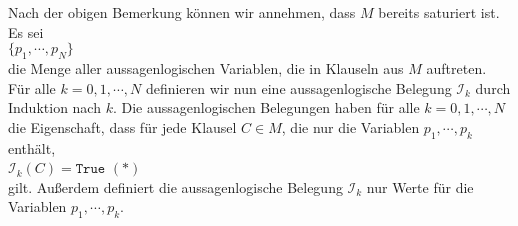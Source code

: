 Nach der obigen Bemerkung können wir annehmen, dass $M$ bereits saturiert ist. Es sei 
\\[0.2cm]
\hspace*{1.3cm}
$\{ p_1, \cdots, p_N \}$
\\[0.2cm]
die Menge aller aussagenlogischen Variablen, die in Klauseln aus $M$ auftreten.  Für alle $k=0,1,\cdots,N$
definieren wir nun eine aussagenlogische Belegung $\mathcal{I}_k$ durch Induktion nach $k$.  Die
aussagenlogischen Belegungen haben für alle $k=0,1,\cdots,N$ die Eigenschaft, dass für jede Klausel $C \in M$,
die nur die Variablen $p_1,\cdots,p_k$ enthält,
\\[0.2cm]
\hspace*{1.3cm}
$\mathcal{I}_k(C) = \mathtt{True}$ \hspace*{\fill} $(*)$
\\[0.2cm]
gilt.  Außerdem definiert die aussagenlogische Belegung $\mathcal{I}_k$ nur Werte für die Variablen $p_1,\cdots,p_k$.
